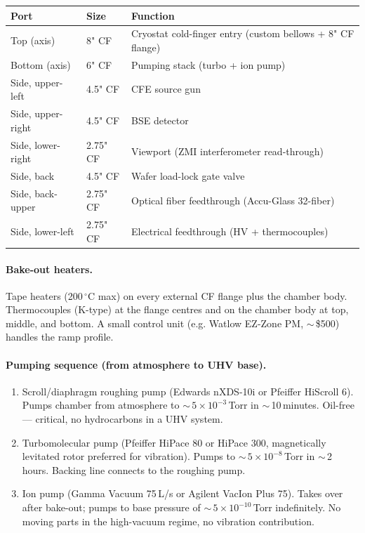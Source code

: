 \documentclass[11pt,letterpaper]{article}
\begin{document}
\begin{center}
\small
\begin{tabular}{lll}
\toprule
\textbf{Port} & \textbf{Size} & \textbf{Function} \\
\midrule
Top (axis)         & 8" CF    & Cryostat cold-finger entry (custom bellows + 8" CF flange) \\
Bottom (axis)      & 6" CF    & Pumping stack (turbo + ion pump) \\
Side, upper-left   & 4.5" CF  & CFE source gun \\
Side, upper-right  & 4.5" CF  & BSE detector \\
Side, lower-right  & 2.75" CF & Viewport (ZMI interferometer read-through) \\
Side, back         & 4.5" CF  & Wafer load-lock gate valve \\
Side, back-upper   & 2.75" CF & Optical fiber feedthrough (Accu-Glass 32-fiber) \\
Side, lower-left   & 2.75" CF & Electrical feedthrough (HV + thermocouples) \\
\bottomrule
\end{tabular}
\end{center}

\paragraph{Bake-out heaters.} Tape heaters (200\,$^\circ$C max) on every external CF flange plus the chamber body. Thermocouples (K-type) at the flange centres and on the chamber body at top, middle, and bottom. A small control unit (e.g. Watlow EZ-Zone PM, $\sim$\,\$500) handles the ramp profile.

\paragraph{Pumping sequence (from atmosphere to UHV base).}
\begin{enumerate}[leftmargin=1.6em]
  \item Scroll/diaphragm roughing pump (Edwards nXDS-10i or Pfeiffer HiScroll 6). Pumps chamber from atmosphere to $\sim$\,$5 \times 10^{-3}$\,Torr in $\sim$\,10\,minutes. Oil-free --- critical, no hydrocarbons in a UHV system.
  \item Turbomolecular pump (Pfeiffer HiPace 80 or HiPace 300, magnetically levitated rotor preferred for vibration). Pumps to $\sim$\,$5 \times 10^{-8}$\,Torr in $\sim$\,2\,hours. Backing line connects to the roughing pump.
  \item Ion pump (Gamma Vacuum 75\,L/s or Agilent VacIon Plus 75). Takes over after bake-out; pumps to base pressure of $\sim$\,$5 \times 10^{-10}$\,Torr indefinitely. No moving parts in the high-vacuum regime, no vibration contribution.
\end{enumerate}
\end{document}

